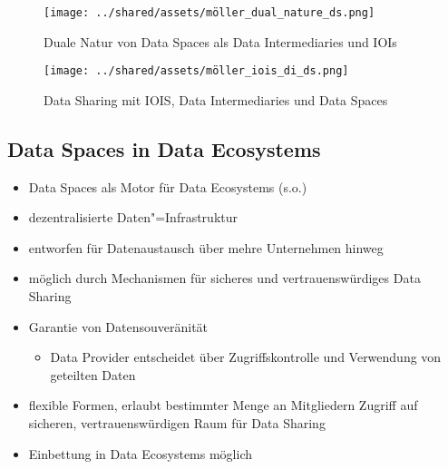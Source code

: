 \begin{figure}
    \texttt{[image: ../shared/assets/möller\_dual\_nature\_ds.png]}
    \caption{Duale Natur von Data Spaces als Data Intermediaries und IOIs~\cite{mollerIndustrialDataEcosystems2024}}
    \label{fig:dual-nature-ds}
\end{figure}

\begin{figure}
    \texttt{[image: ../shared/assets/möller\_iois\_di\_ds.png]}
    \caption{Data Sharing mit IOIS, Data Intermediaries und Data Spaces~\cite{mollerIndustrialDataEcosystems2024}}
\end{figure}


\subsection{Data Spaces in Data Ecosystems}

\begin{itemize}
    \item Data Spaces als Motor für Data Ecosystems (s.o.)
    \item dezentralisierte Daten"=Infrastruktur
    \item entworfen für Datenaustausch über mehre Unternehmen hinweg
    \item möglich durch Mechanismen für sicheres und vertrauenswürdiges Data Sharing
    \item Garantie von Datensouveränität
    \begin{itemize}
        \item Data Provider entscheidet über Zugriffskontrolle und Verwendung von geteilten Daten
    \end{itemize}
    \item flexible Formen, erlaubt bestimmter Menge an Mitgliedern Zugriff auf sicheren, vertrauenswürdigen Raum für Data Sharing
    \item Einbettung in Data Ecosystems möglich~\cite{mollerIndustrialDataEcosystems2024}
\end{itemize}

\vspace{1em}

